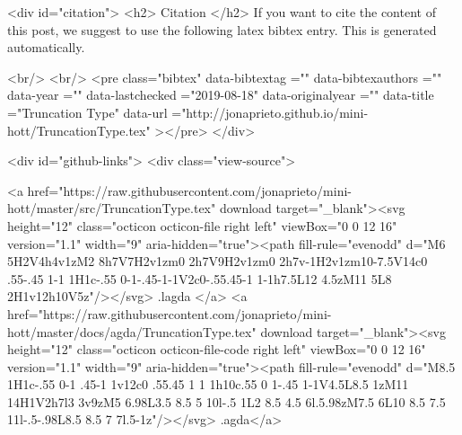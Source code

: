   
  <div id="citation">
  <h2> Citation </h2>
  If you want to cite the content of this post,
  we suggest to use the following latex bibtex entry.
  This is generated automatically.

  <br/>
  <br/>
  <pre class="bibtex"
       data-bibtextag =""
       data-bibtexauthors =""
       data-year =""
       data-lastchecked ="2019-08-18"
       data-originalyear =""
       data-title ="Truncation Type"
       data-url ="http://jonaprieto.github.io/mini-hott/TruncationType.tex"
  ></pre>
  </div>
  

  <div id="github-links">
    <div class="view-source">
      
        <a href="https://raw.githubusercontent.com/jonaprieto/mini-hott/master/src/TruncationType.tex" download target="_blank"><svg height="12" class="octicon octicon-file right left" viewBox="0 0 12 16" version="1.1" width="9" aria-hidden="true"><path fill-rule="evenodd" d="M6 5H2V4h4v1zM2 8h7V7H2v1zm0 2h7V9H2v1zm0 2h7v-1H2v1zm10-7.5V14c0 .55-.45 1-1 1H1c-.55 0-1-.45-1-1V2c0-.55.45-1 1-1h7.5L12 4.5zM11 5L8 2H1v12h10V5z"/></svg> .lagda </a>
        <a href="https://raw.githubusercontent.com/jonaprieto/mini-hott/master/docs/agda/TruncationType.tex" download target="_blank"><svg height="12" class="octicon octicon-file-code right left" viewBox="0 0 12 16" version="1.1" width="9" aria-hidden="true"><path fill-rule="evenodd" d="M8.5 1H1c-.55 0-1 .45-1 1v12c0 .55.45 1 1 1h10c.55 0 1-.45 1-1V4.5L8.5 1zM11 14H1V2h7l3 3v9zM5 6.98L3.5 8.5 5 10l-.5 1L2 8.5 4.5 6l.5.98zM7.5 6L10 8.5 7.5 11l-.5-.98L8.5 8.5 7 7l.5-1z"/></svg> .agda</a>
      
